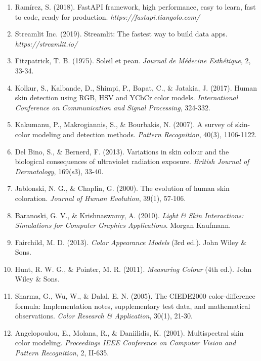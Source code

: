\begin{enumerate}
\item Ramírez, S. (2018). FastAPI framework, high performance, easy to learn, fast to code, ready for production. \textit{https://fastapi.tiangolo.com/}

\item Streamlit Inc. (2019). Streamlit: The fastest way to build data apps. \textit{https://streamlit.io/}

\item Fitzpatrick, T. B. (1975). Soleil et peau. \textit{Journal de Médecine Esthétique}, 2, 33-34.

\item Kolkur, S., Kalbande, D., Shimpi, P., Bapat, C., \& Jatakia, J. (2017). Human skin detection using RGB, HSV and YCbCr color models. \textit{International Conference on Communication and Signal Processing}, 324-332.

\item Kakumanu, P., Makrogiannis, S., \& Bourbakis, N. (2007). A survey of skin-color modeling and detection methods. \textit{Pattern Recognition}, 40(3), 1106-1122.

\item Del Bino, S., \& Bernerd, F. (2013). Variations in skin colour and the biological consequences of ultraviolet radiation exposure. \textit{British Journal of Dermatology}, 169(s3), 33-40.

\item Jablonski, N. G., \& Chaplin, G. (2000). The evolution of human skin coloration. \textit{Journal of Human Evolution}, 39(1), 57-106.

\item Baranoski, G. V., \& Krishnaswamy, A. (2010). \textit{Light \& Skin Interactions: Simulations for Computer Graphics Applications}. Morgan Kaufmann.

\item Fairchild, M. D. (2013). \textit{Color Appearance Models} (3rd ed.). John Wiley \& Sons.

\item Hunt, R. W. G., \& Pointer, M. R. (2011). \textit{Measuring Colour} (4th ed.). John Wiley \& Sons.

\item Sharma, G., Wu, W., \& Dalal, E. N. (2005). The CIEDE2000 color-difference formula: Implementation notes, supplementary test data, and mathematical observations. \textit{Color Research \& Application}, 30(1), 21-30.

\item Angelopoulou, E., Molana, R., \& Daniilidis, K. (2001). Multispectral skin color modeling. \textit{Proceedings IEEE Conference on Computer Vision and Pattern Recognition}, 2, II-635.


\end{enumerate}
